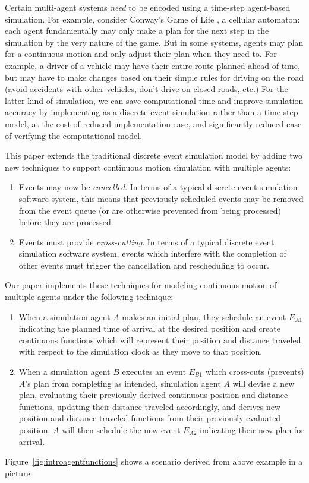 \documentclass[conference,letterpaper]{IEEEtran}
\begin{document}
Certain multi-agent systems \emph{need} to be encoded using a time-step
agent-based simulation. For example, consider Conway's Game of
Life \cite{conway}, a cellular automaton: each agent fundamentally may only make
a plan for the next step in the simulation by the very nature of the game. But
in some systems, agents may plan for a continuous motion and only adjust their
plan when they need to. For example, a driver of a vehicle may have their
entire route planned ahead of time, but may have to make changes based on their
simple rules for driving on the road (avoid accidents with other vehicles,
don't drive on closed roads, etc.) For the latter kind of simulation, we can
save computational time and improve simulation accuracy by implementing as a
discrete event simulation rather than a time step model, at the cost of reduced
implementation ease, and significantly reduced ease of verifying the
computational model.

This paper extends the traditional discrete event simulation model by adding
two new techniques to support continuous motion simulation with multiple
agents:
\begin{enumerate}
    \item Events may now be \emph{cancelled}. In terms of a typical discrete
        event simulation software system, this means that previously scheduled
        events may be removed from the event queue (or are otherwise prevented
        from being processed) before they are processed.
    \item Events must provide \emph{cross-cutting}. In terms of a typical
        discrete event simulation software system, events which interfere with
        the completion of other events must trigger the cancellation and
        rescheduling to occur.
\end{enumerate}

Our paper implements these techniques for modeling continuous motion of
multiple agents under the following technique:
\begin{enumerate}
    \item When a simulation agent $A$ makes an initial plan, they schedule an
        event $E_{A1}$ indicating the planned time of arrival at the desired
        position and create continuous functions which will represent their
        position and distance traveled with respect to the simulation clock as
        they move to that position.
    \item When a simulation agent $B$ executes an event $E_{B1}$ which
        cross-cuts (prevents) $A$'s plan from completing as intended,
        simulation agent $A$ will devise a new plan, evaluating their
        previously derived continuous position and distance functions, updating
        their distance traveled accordingly, and derives new position and
        distance traveled functions from their previously evaluated position.
        $A$ will then schedule the new event $E_{A2}$ indicating their new plan
        for arrival.
\end{enumerate}
Figure~\ref{fig:introagentfunctions} shows a scenario derived from above
example in a picture.
\end{document}
